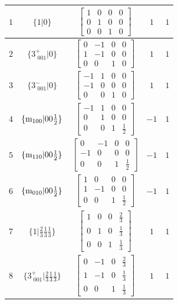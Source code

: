 \documentclass[fleqn,8pt]{jsarticle}
\begin{document}
\begin{longtable}{ccccc}
$ 1 $ & $ \{1|0\} $ & $ \begin{bmatrix} 1 & 0 & 0 & 0 \\ 0 & 1 & 0 & 0 \\ 0 & 0 & 1 & 0 \end{bmatrix} $ & $ 1 $ & $ 1 $ \\ \hline
$ 2 $ & $ \{3^{+}_{\,\,001}|0\} $ & $ \begin{bmatrix} 0 & -1 & 0 & 0 \\ 1 & -1 & 0 & 0 \\ 0 & 0 & 1 & 0 \end{bmatrix} $ & $ 1 $ & $ 1 $ \\ \hline
$ 3 $ & $ \{3^{-}_{\,\,001}|0\} $ & $ \begin{bmatrix} -1 & 1 & 0 & 0 \\ -1 & 0 & 0 & 0 \\ 0 & 0 & 1 & 0 \end{bmatrix} $ & $ 1 $ & $ 1 $ \\ \hline
$ 4 $ & $ \{{\rm m}_{100}|0 0 \frac{1}{2}\} $ & $ \begin{bmatrix} -1 & 1 & 0 & 0 \\ 0 & 1 & 0 & 0 \\ 0 & 0 & 1 & \frac{1}{2} \end{bmatrix} $ & $ -1 $ & $ 1 $ \\ \hline
$ 5 $ & $ \{{\rm m}_{110}|0 0 \frac{1}{2}\} $ & $ \begin{bmatrix} 0 & -1 & 0 & 0 \\ -1 & 0 & 0 & 0 \\ 0 & 0 & 1 & \frac{1}{2} \end{bmatrix} $ & $ -1 $ & $ 1 $ \\ \hline
$ 6 $ & $ \{{\rm m}_{010}|0 0 \frac{1}{2}\} $ & $ \begin{bmatrix} 1 & 0 & 0 & 0 \\ 1 & -1 & 0 & 0 \\ 0 & 0 & 1 & \frac{1}{2} \end{bmatrix} $ & $ -1 $ & $ 1 $ \\ \hline
$ 7 $ & $ \{1|\frac{2}{3} \frac{1}{3} \frac{1}{3}\} $ & $ \begin{bmatrix} 1 & 0 & 0 & \frac{2}{3} \\ 0 & 1 & 0 & \frac{1}{3} \\ 0 & 0 & 1 & \frac{1}{3} \end{bmatrix} $ & $ 1 $ & $ 1 $ \\ \hline
$ 8 $ & $ \{3^{+}_{\,\,001}|\frac{2}{3} \frac{1}{3} \frac{1}{3}\} $ & $ \begin{bmatrix} 0 & -1 & 0 & \frac{2}{3} \\ 1 & -1 & 0 & \frac{1}{3} \\ 0 & 0 & 1 & \frac{1}{3} \end{bmatrix} $ & $ 1 $ & $ 1 $ \\ \hline

\end{longtable}
\end{document}
